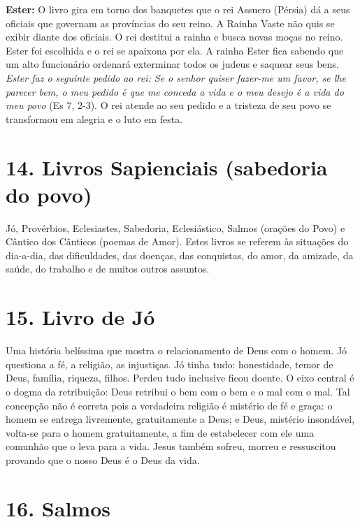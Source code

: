 \documentclass[
]{book}
\begin{document}
\textbf{Ester:} O livro gira em torno dos banquetes que o rei Assuero (Pérsia) dá a seus oficiais que governam as províncias do seu reino. A Rainha Vaste não quis se exibir diante dos oficiais. O rei destitui a rainha e busca novas moças no reino. Ester foi escolhida e o rei se apaixona por ela. A rainha Ester fica sabendo que um alto funcionário ordenará exterminar todos os judeus e saquear seus bens. \emph{Ester faz o seguinte pedido ao rei: Se o senhor quiser fazer-me um favor, se lhe parecer bem, o meu pedido é que me conceda a vida e o meu desejo é a vida do meu povo} (Es 7, 2-3). O rei atende ao seu pedido e a tristeza de seu povo se transformou em alegria e o luto em festa.

\hypertarget{livros-sapienciais-sabedoria-do-povo}{%
\section*{14. Livros Sapienciais (sabedoria do povo)}\label{livros-sapienciais-sabedoria-do-povo}}

Jó, Provérbios, Eclesiastes, Sabedoria, Eclesiástico, Salmos (orações do Povo) e Cântico dos Cânticos (poemas de Amor). Estes livros se referem às situações do dia-a-dia, das dificuldades, das doenças, das conquistas, do amor, da amizade, da saúde, do trabalho e de muitos outros assuntos.

\hypertarget{livro-de-juxf3}{%
\section*{15. Livro de Jó}\label{livro-de-juxf3}}

Uma história belíssima que mostra o relacionamento de Deus com o homem. Jó questiona a fé, a religião, as injustiças. Jó tinha tudo: honestidade, temor de Deus, família, riqueza, filhos. Perdeu tudo inclusive ficou doente. O eixo central é o dogma da retribuição: Deus retribui o bem com o bem e o mal com o mal. Tal concepção não é correta pois a verdadeira religião é mistério de fé e graça: o homem se entrega livremente, gratuitamente a Deus; e Deus, mistério insondável, volta-se para o homem gratuitamente, a fim de estabelecer com ele uma comunhão que o leva para a vida. Jesus também sofreu, morreu e ressuscitou provando que o nosso Deus é o Deus da vida.

\hypertarget{salmos}{%
\section*{16. Salmos}\label{salmos}}
\end{document}
